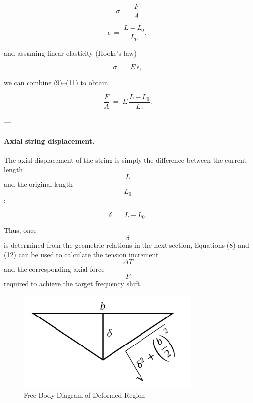 \documentclass[12pt]{article}
\theoremstyle{definition} %
\theoremstyle{plain} %
\begin{document}
\begin{equation}
  \sigma \;=\; \frac{F}{A}
  \tag{9}
\end{equation}

\begin{equation}
  \epsilon \;=\; \frac{L - L_0}{L_0},
  \tag{10}
\end{equation}

and assuming linear elasticity (Hooke’s law)

\begin{equation}
  \sigma \;=\; E\,\epsilon,
  \tag{11}
\end{equation}

we can combine (9)–(11) to obtain

\begin{equation}
  \frac{F}{A}
    \;=\;
  E\,\frac{L - L_0}{L_0}.
  \tag{12}
\end{equation}

---

\paragraph*{Axial string displacement.}
The axial displacement of the string is simply the difference between the
current length $$L$$ and the original length $$L_0$$:

\begin{equation}
  \delta \;=\; L - L_0.
  \tag{13}
\end{equation}

Thus, once $$\delta$$ is determined from the geometric relations in the
next section, Equations (8) and (12) can be used to calculate the tension
increment $$\Delta T$$ and the corresponding axial force $$F$$ required to
achieve the target frequency shift.

\begin{figure}[htbp]
  \centering
  \includegraphics[width=0.8\textwidth]{classes/Mathematics-of-Guitar-Strings/06-10/fgs/fig14.png}
  \caption{Free Body Diagram of Deformed Region}
  \label{fig:}
\end{figure}
\end{document}
